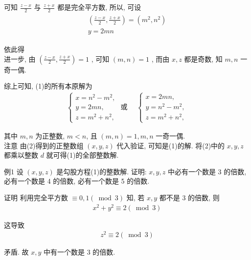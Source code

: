 	可知 $\frac{z-x}{2}$ 与 $\frac{z+x}{2}$ 都是完全平方数, 所以, 可设
\begin{align*}
		\begin{gathered}
			\left(\frac{z-x}{2}, \frac{z+x}{2}\right)=\left(m^{2}, n^{2}\right) \\
			y=2 m n
		\end{gathered}
	\end{align*}

	依此得\\
	进一步, 由 $\left(\frac{z-x}{2}, \frac{z+x}{2}\right)=1$ , 可知 $(m, n)=1$ , 而由 $x ,  z$ 都是奇数, 知 $m, n$ 一奇一偶.

	综上可知, (1)的所有本原解为
\begin{align*}
		\left\{\begin{array} { l }
			       { x = n ^ { 2 } - m ^ { 2 } , } \\
			       { y = 2 m n , }                 \\
			       { z = m ^ { 2 } + n ^ { 2 } , }
		       \end{array} \text { 或 } \quad \left\{\begin{array}{l}
			                                             x=2 m n,       \\
			                                             y=n^{2}-m^{2}, \\
			                                             z=m^{2}+n^{2},
		                                             \end{array}\right.\right.
	\end{align*}

	其中 $m ,  n$ 为正整数, $m<n$, 且 $(m, n)=1, m ,  n$ 一奇一偶.\\
	注意 由(2)得到的正整数组 $(x, y, z)$ 代入验证, 可知是(1)的解. 将(2)中的 $x ,  y ,  z$ 都乘以整数 $d$ 就可得(1)的全部整数解.

	例1 设 $(x, y, z)$ 是勾股方程(1)的整数解. 证明: $x ,  y ,  z$ 中必有一个数是 3 的倍数, 必有一个数是 4 的倍数, 必有一个数是 5 的倍数.

	证明 利用完全平方数 $\equiv 0,1(\bmod 3)$ 知, 若 $x ,  y$ 都不是 3 的倍数, 则
\begin{align*}
		x^{2}+y^{2} \equiv 2(\bmod 3)
	\end{align*}

	这导致
\begin{align*}
		z^{2} \equiv 2(\bmod 3)
	\end{align*}

	矛盾. 故 $x ,  y$ 中有一个数是 3 的倍数.

